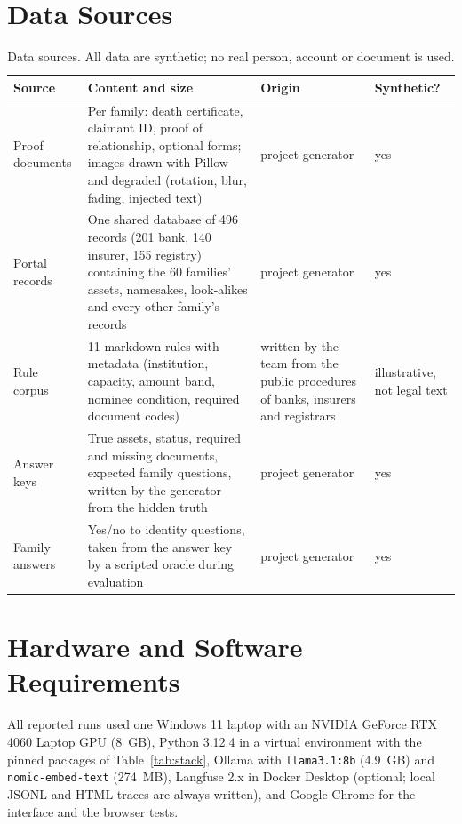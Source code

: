 \section{Data Sources}\label{sec:data}
\begin{table}[H]
\centering\small{}
\caption[Data sources]{Data sources. All data are synthetic; no real person, account or document is used.}\label{tab:datasrc}
\renewcommand{\arraystretch}{1.15}
\begin{tabularx}{\linewidth}{@{}p{3.1cm}Xp{2.3cm}p{1.9cm}@{}}
\toprule
\textbf{Source} & \textbf{Content and size} & \textbf{Origin} & \textbf{Synthetic?} \\ \midrule
Proof documents & Per family: death certificate, claimant ID, proof of relationship, optional forms; images drawn with Pillow and degraded (rotation, blur, fading, injected text) & project generator & yes \\
Portal records & One shared database of 496 records (201 bank, 140 insurer, 155 registry) containing the 60 families' assets, namesakes, look-alikes and every other family's records & project generator & yes \\
Rule corpus & 11 markdown rules with metadata (institution, capacity, amount band, nominee condition, required document codes) & written by the team from the public procedures of banks, insurers and registrars & illustrative, not legal text \\
Answer keys & True assets, status, required and missing documents, expected family questions, written by the generator from the hidden truth & project generator & yes \\
Family answers & Yes/no to identity questions, taken from the answer key by a scripted oracle during evaluation & project generator & yes \\ \bottomrule
\end{tabularx}
\end{table}

\section{Hardware and Software Requirements}
All reported runs used one Windows 11 laptop with an NVIDIA GeForce RTX 4060 Laptop GPU (8~GB), Python 3.12.4 in a virtual environment with the pinned packages of Table~\ref{tab:stack}, Ollama with \texttt{llama3.1:8b} (4.9~GB) and \texttt{nomic-embed-text} (274~MB), Langfuse 2.x in Docker Desktop (optional; local JSONL and HTML traces are always written), and Google Chrome for the interface and the browser tests.

